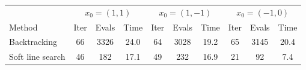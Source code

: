 \begin{tabular}{l|ccc|ccc|ccc} \hline \hline 
& \multicolumn{3}{c}{$x_0 = (1,1)$} & \multicolumn{3}{c}{$x_0 = (1,-1)$} & \multicolumn{3}{c}{$x_0 = (-1,0)$} \\ 
Method & Iter & Evals & Time & Iter & Evals & Time & Iter & Evals & Time \\ \hline 
Backtracking & 66 & 3326 & 24.0 & 64 & 3028 & 19.2 & 65 & 3145 & 20.4 \\ 
Soft line search & 46 & 182 & 17.1 & 49 & 232 & 16.9 & 21 & 92 & 7.4 \\ 
\hline \hline 
\end{tabular} 
